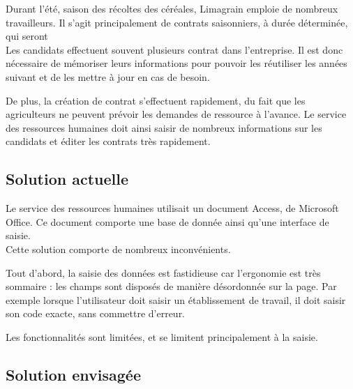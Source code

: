 Durant l'été, saison des récoltes des céréales, Limagrain emploie de nombreux travailleurs.
Il s'agit principalement de contrats saisonniers, à durée déterminée, qui seront 
\\

Les candidats effectuent souvent plusieurs contrat dans l'entreprise.
Il est donc nécessaire de mémoriser leurs informations pour pouvoir les réutiliser les années suivant et de les mettre à jour en cas de besoin.

De plus, la création de contrat s'effectuent rapidement, du fait que les agriculteurs ne peuvent prévoir les demandes de ressource à l'avance.
Le service des ressources humaines doit ainsi saisir de nombreux informations sur les candidats et éditer les contrats très rapidement.




\subsection{Solution actuelle}

Le service des ressources humaines utilisait un document Access, de Microsoft Office.
Ce document comporte une base de donnée ainsi qu'une interface de saisie.
\\

Cette solution comporte de nombreux inconvénients.

Tout d'abord, la saisie des données est fastidieuse car l'ergonomie est très sommaire : les champs sont disposés de manière désordonnée sur la page. Par exemple lorsque l'utilisateur doit saisir un établissement de travail, il doit saisir son code exacte, sans commettre d'erreur.

Les fonctionnalités sont limitées, et se limitent principalement à la saisie.




\subsection{Solution envisagée}

